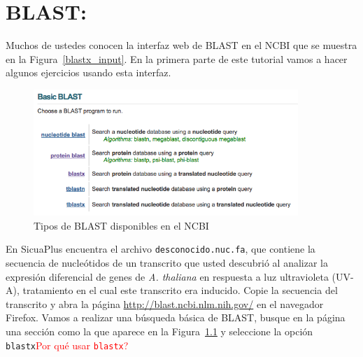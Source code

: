 \documentclass[letter,11pt]{book}
\begin{document}
%
%
%
%

\chapter{BLAST: }

Muchos de ustedes conocen la interfaz web de BLAST en el NCBI que se muestra en la Figura~\ref{blastx_input}.  En la primera parte de este tutorial vamos a hacer algunos ejercicios usando esta interfaz. 

\begin{figure}[h!]
\centering
   \includegraphics[width=10cm]{Figs/blasthomepage.png}
  \caption{\label{blasthomepage}Tipos de BLAST disponibles en el NCBI}
\end{figure}

En SicuaPlus encuentra el archivo \Verb+desconocido.nuc.fa+, que contiene la secuencia de nucleótidos de un transcrito que usted descubrió al analizar la expresión diferencial de genes de \textit{A. thaliana} en respuesta a luz ultravioleta (UV-A), tratamiento en el cual este transcrito era inducido. Copie la secuencia del transcrito y abra la página \url{http://blast.ncbi.nlm.nih.gov/} en el navegador Firefox. Vamos a realizar una búsqueda básica de BLAST, busque en la página una sección como la que aparece en la Figura~\ref{blasthomepage} y seleccione la opción \Verb+blastx+\textcolor{red}{{\textquestiondown}Por qué usar \Verb+blastx+?}
\end{document}
